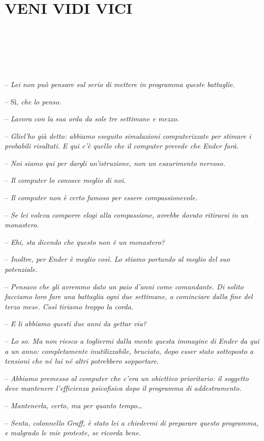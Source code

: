 \chapter{VENI VIDI VICI}

{~}

{~}

{~}

{-- \emph{Lei non può pensare sul serio di mettere in programma queste
		battaglie.}}

{-- Sì, \emph{che lo penso.}}

{-- \emph{Lavora con la sua orda da sole tre settimane e mezzo.}}

{-- \emph{Gliel'ho già detto: abbiamo eseguito simulazioni
		computerizzate per stimare i probabili risultati. E qui c'è quello che
		il computer prevede che Ender farà.}}

{-- \emph{Noi siamo qui per dargli un'istruzione, non un esaurimento
		nervoso.}}

{-- \emph{Il computer lo conosce meglio di noi.}}

{-- \emph{Il computer non è certo famoso per essere compassionevole.}}

{-- \emph{Se lei voleva comporre elogi alla compassione, avrebbe dovuto
		ritirarsi in un monastero.}}

{-- \emph{Ehi, sta dicendo che questo non è un monastero?}}

{-- \emph{Inoltre, per Ender è meglio così. Lo stiamo portando al meglio
		del suo potenziale.}}

{-- \emph{Pensavo che gli avremmo dato un paio d'anni come comandante.
		Di solito facciamo loro fare una battaglia ogni due settimane, a
		cominciare dalla fine del terzo mese. Così tiriamo troppo la corda.}}

{-- \emph{E li abbiamo questi due anni da gettar via?}}

{-- \emph{Lo so. Ma non riesco a togliermi dalla mente questa immagine
		di Ender da qui a un anno: completamente inutilizzabile, bruciato, dopo
		esser stato sottoposto a tensioni che né lui né altri potrebbero
		sopportare.}}

{-- \emph{Abbiamo premesso al computer che c'era un obiettivo
		prioritario: il soggetto deve mantenere l'efficienza psicofisica dopo il
		programma di addestramento.}}

{-- \emph{Mantenerla, certo, ma per quanto tempo\ldots{}}}

{-- \emph{Senta, colonnello Graff, è stato lei a chiedermi di preparare
		questo programma, e malgrado le mie proteste, se ricorda bene.}}

